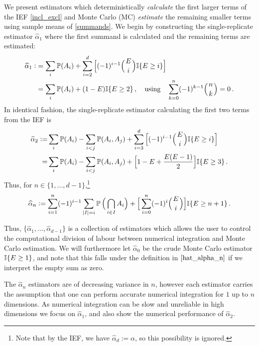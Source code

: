 We present estimators which deterministically \emph{calculate} the first larger terms of the IEF \eqref{incl_excl} and Monte Carlo (MC) \emph{estimate} the remaining smaller terms using sample means of \eqref{summands}.
We begin by constructing the single-replicate estimator $\hat{\alpha}_1$
where the first summand is calculated and the remaining terms are estimated:
\begin{align*}
	\widehat{\alpha}_1 :&= \sum_i \operatorname{{\mathbb P}}(A_i)  + \sum_{i=2}^d \Big[ (-1)^{i-1} 
	 \Bigl({{E}\atop i}\Bigr) \mathbb I\{E \ge i\} \Big] \\
	&= \sum_i \operatorname{{\mathbb P}}(A_i) 
+ (1 - E) \mathbb I\{E \ge 2 \} \,, \quad \text{using} \quad \sum_{k=0}^n (-1)^{k-1} \Bigl({{n}\atop k}\Bigr) = 0 \,.
\end{align*}
In identical fashion, the single-replicate estimator calculating the first two terms from the IEF is
\begin{align*}
	\widehat{\alpha}_2 
	:=& \sum_i \operatorname{{\mathbb P}}(A_i) - \sum_{i<j}\operatorname{{\mathbb P}}(A_i, A_j) + \sum_{i=3}^d \Big[ (-1)^{i-1} \Bigl({{E}\atop i}\Bigr) \mathbb I\{E \ge i\} \Big] \\
	=& \sum_i \operatorname{{\mathbb P}}(A_i) - \sum_{i<j}\operatorname{{\mathbb P}}(A_i, A_j) + \Big[1 - E + \frac{E (E-1)}{2} \Big] \mathbb I\{E \ge 3\} \,.
\end{align*}
Thus, for $n \in \{1,\dots,d-1\}$,\footnote{Note that by the IEF, we have
$\hat{\alpha}_d:=\alpha$, so this possibility is ignored.}
\begin{equation} \label{hat_alpha_n}
	\widehat{\alpha}_n :=
\sum_{i=1}^n (-1)^{i-1} \sum_{|I|=i} \operatorname{{\mathbb P}}\Big( \bigcap_{i\in I} A_i \Big)
+ \Big[ \sum_{i=0}^n (-1)^{i} \Bigl({{E}\atop i}\Bigr) \Big] \mathbb I\{ E \ge n+1\} \,. 
\end{equation}

Thus, $\{\hat{\alpha}_1,\dots,\hat{\alpha}_{d-1}\}$ is a collection of estimators which allows the user to control the computational division of labour between numerical integration and Monte Carlo estimation. We will furthermore let
$\hat{\alpha}_0$ be the crude Monte Carlo estimator $\mathbb I\{E \ge 1\}$, and note that this falls under
the definition in $\eqref{hat_alpha_n}$ if we interpret the empty sum as zero.

The $\hat{\alpha}_n$ estimators are of decreasing variance in $n$, however each estimator carries the assumption that one can perform accurate numerical integration for $1$ up to $n$ dimensions. 
As numerical integration can be slow and unreliable in high dimensions we focus on $\hat{\alpha}_1$, and also show the numerical performance of $\hat{\alpha}_2$.

